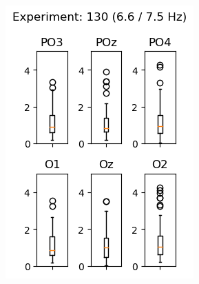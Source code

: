 \begin{figure}[ht]
    \centering
    \begin{subfigure}{0.25\textwidth}
        \includegraphics[width=\linewidth]{images/results/1306675.png}
        \label{fig:1306675}
    \end{subfigure}
    \begin{subfigure}{0.25\textwidth}

\end{subfigure}
\end{figure}
